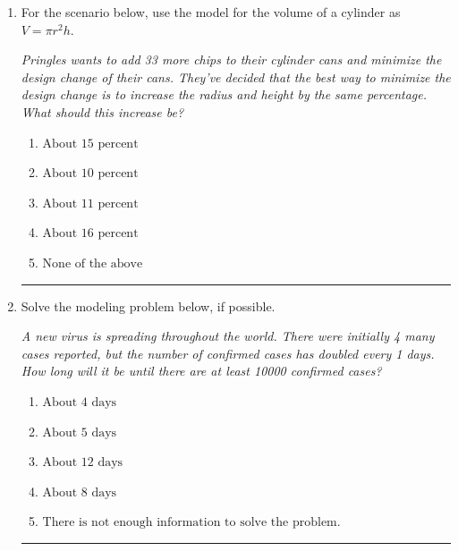 \documentclass[14pt]{extbook}
\newcommand{\litem}[1]{\item#1\hspace*{-1cm}\rule{\textwidth}{0.4pt}}
\begin{document}
\begin{enumerate}
{\begin{enumerate}[label=\Alph*.]
\end{enumerate} }
\litem{
For the scenario below, use the model for the volume of a cylinder as $V = \pi r^2 h$.
\begin{center}
    \textit{ Pringles wants to add 33 \text{percent} more chips to their cylinder cans and minimize the design change of their cans. They've decided that the best way to minimize the design change is to increase the radius and height by the same percentage. What should this increase be? }
\end{center}
\begin{enumerate}[label=\Alph*.]
\item \( \text{About } 15 \text{ percent} \)
\item \( \text{About } 10 \text{ percent} \)
\item \( \text{About } 11 \text{ percent} \)
\item \( \text{About } 16 \text{ percent} \)
\item \( \text{None of the above} \)

\end{enumerate} }
\litem{
Solve the modeling problem below, if possible.
\begin{center}
    \textit{ A new virus is spreading throughout the world. There were initially 4 many cases reported, but the number of confirmed cases has doubled every 1 days. How long will it be until there are at least 10000 confirmed cases? }
\end{center}
\begin{enumerate}[label=\Alph*.]
\item \( \text{About } 4 \text{ days} \)
\item \( \text{About } 5 \text{ days} \)
\item \( \text{About } 12 \text{ days} \)
\item \( \text{About } 8 \text{ days} \)
\item \( \text{There is not enough information to solve the problem.} \)


\end{enumerate}}
\end{enumerate}
\end{document}
